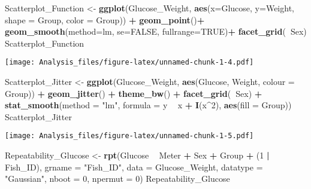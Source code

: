 \documentclass[]{article}
\newenvironment{Shaded}{\begin{snugshade}}{\end{snugshade}}
\newcommand{\KeywordTok}[1]{\textcolor[rgb]{0.13,0.29,0.53}{\textbf{#1}}}
\newcommand{\DataTypeTok}[1]{\textcolor[rgb]{0.13,0.29,0.53}{#1}}
\newcommand{\DecValTok}[1]{\textcolor[rgb]{0.00,0.00,0.81}{#1}}
\newcommand{\StringTok}[1]{\textcolor[rgb]{0.31,0.60,0.02}{#1}}
\newcommand{\OtherTok}[1]{\textcolor[rgb]{0.56,0.35,0.01}{#1}}
\newcommand{\OperatorTok}[1]{\textcolor[rgb]{0.81,0.36,0.00}{\textbf{#1}}}
\newcommand{\NormalTok}[1]{#1}
\begin{document}
\begin{Shaded}
\begin{Highlighting}[]
\NormalTok{Scatterplot_Function <-}\StringTok{ }\KeywordTok{ggplot}\NormalTok{(Glucose_Weight, }\KeywordTok{aes}\NormalTok{(}\DataTypeTok{x=}\NormalTok{Glucose, }\DataTypeTok{y=}\NormalTok{Weight, }\DataTypeTok{shape =}\NormalTok{ Group, }\DataTypeTok{color =}\NormalTok{ Group)) }\OperatorTok{+}\StringTok{ }
\StringTok{  }\KeywordTok{geom_point}\NormalTok{()}\OperatorTok{+}
\StringTok{  }\KeywordTok{geom_smooth}\NormalTok{(}\DataTypeTok{method=}\NormalTok{lm, }\DataTypeTok{se=}\OtherTok{FALSE}\NormalTok{, }\DataTypeTok{fullrange=}\OtherTok{TRUE}\NormalTok{)}\OperatorTok{+}
\StringTok{  }\KeywordTok{facet_grid}\NormalTok{(}\OperatorTok{~}\NormalTok{Sex)  }
\NormalTok{Scatterplot_Function}
\end{Highlighting}
\end{Shaded}

\texttt{[image: Analysis\_files/figure-latex/unnamed-chunk-1-4.pdf]}

\begin{Shaded}
\begin{Highlighting}[]
\NormalTok{Scatterplot_Jitter <-}\StringTok{ }\KeywordTok{ggplot}\NormalTok{(Glucose_Weight, }\KeywordTok{aes}\NormalTok{(Glucose, Weight, }\DataTypeTok{colour =}\NormalTok{ Group)) }\OperatorTok{+}
\StringTok{  }\KeywordTok{geom_jitter}\NormalTok{() }\OperatorTok{+}
\StringTok{  }\KeywordTok{theme_bw}\NormalTok{() }\OperatorTok{+}
\StringTok{  }\KeywordTok{facet_grid}\NormalTok{(}\OperatorTok{~}\NormalTok{Sex) }\OperatorTok{+}
\StringTok{  }\KeywordTok{stat_smooth}\NormalTok{(}\DataTypeTok{method =} \StringTok{"lm"}\NormalTok{, }\DataTypeTok{formula =}\NormalTok{ y }\OperatorTok{~}\StringTok{ }\NormalTok{x }\OperatorTok{+}\StringTok{ }\KeywordTok{I}\NormalTok{(x}\OperatorTok{^}\DecValTok{2}\NormalTok{), }\KeywordTok{aes}\NormalTok{(}\DataTypeTok{fill =}\NormalTok{ Group))}
\NormalTok{Scatterplot_Jitter}
\end{Highlighting}
\end{Shaded}

\texttt{[image: Analysis\_files/figure-latex/unnamed-chunk-1-5.pdf]}

\begin{Shaded}
\begin{Highlighting}[]
\NormalTok{Repeatability_Glucose <-}\StringTok{ }\KeywordTok{rpt}\NormalTok{(Glucose }\OperatorTok{~}\StringTok{ }\NormalTok{Meter }\OperatorTok{+}\StringTok{ }\NormalTok{Sex }\OperatorTok{+}\StringTok{ }\NormalTok{Group }\OperatorTok{+}\StringTok{ }\NormalTok{(}\DecValTok{1} \OperatorTok{|}\StringTok{ }\NormalTok{Fish_ID), }\DataTypeTok{grname =} \StringTok{"Fish_ID"}\NormalTok{, }\DataTypeTok{data =}\NormalTok{ Glucose_Weight, }\DataTypeTok{datatype =} \StringTok{"Gaussian"}\NormalTok{, }
                           \DataTypeTok{nboot =} \DecValTok{0}\NormalTok{, }\DataTypeTok{npermut =} \DecValTok{0}\NormalTok{)}
\NormalTok{Repeatability_Glucose}
\end{Highlighting}
\end{Shaded}
\end{document}
